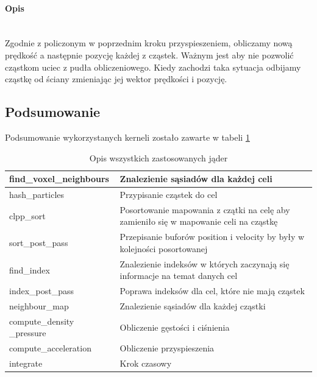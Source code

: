 \documentclass[polish, 12pt]{aghthesis}
\begin{document}
				\paragraph{Opis} \ \\
					\indent Zgodnie z policzonym w poprzednim kroku przyspieszeniem, obliczamy nową prędkość a następnie pozycję każdej z cząstek. Ważnym jest aby nie pozwolić cząstkom uciec z pudła obliczeniowego. Kiedy zachodzi taka sytuacja odbijamy cząstkę od ściany zmieniając jej wektor prędkości i pozycję.
					
		\subsection{Podsumowanie}
		
			\noindent Podsumowanie wykorzystanych kerneli zostało zawarte w tabeli \ref{tab:ker}

			\begin{table}[h!]
			\begin{tabular}{| p{} | p{} |}
				\hline
					find\_voxel\_neighbours & Znalezienie sąsiadów dla każdej celi \\
				\hline
					hash\_particles & Przypisanie cząstek do cel \\
				\hline
					clpp\_sort & Posortowanie mapowania z czątki na celę aby zamieniło się w mapowanie celi na cząstkę\\
				\hline
					sort\_post\_pass & Przepisanie buforów position i velocity by były w kolejności posortowanej\\
				\hline
					find\_index & Znalezienie indeksów w których zaczynają się informacje na temat danych cel \\
				\hline
					index\_post\_pass & Poprawa indeksów dla cel, które nie mają cząstek \\
				\hline
					neighbour\_map & Znalezienie sąsiadów dla każdej cząstki \\
				\hline
					compute\_density \_pressure & Obliczenie gęstości i ciśnienia \\
				\hline
					compute\_acceleration & Obliczenie przyspieszenia \\
				\hline
					integrate & Krok czasowy \\
				\hline
			\end{tabular}
			\caption{Opis wszystkich zastosowanych jąder}
			\label{tab:ker}
			\end{table}
\end{document}
